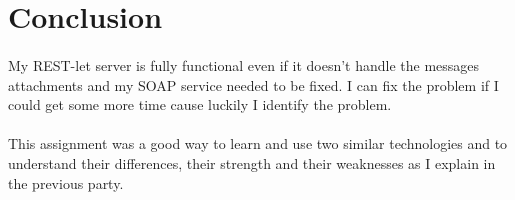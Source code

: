 \section*{Conclusion}

\paragraph{}{
    My REST-let server is fully functional even if it doesn't handle the 
 messages attachments and my SOAP service needed to be fixed. I can fix the
 problem if I could get some more time cause luckily I identify the problem.
}

\paragraph{}{
    This assignment was a good way to learn and use two similar technologies
 and to understand their differences, their strength and their weaknesses as
 I explain in the previous party.
}

